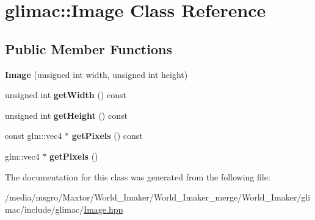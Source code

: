 \hypertarget{classglimac_1_1Image}{}\section{glimac\+:\+:Image Class Reference}
\label{classglimac_1_1Image}
\subsection*{Public Member Functions}
\begin{DoxyCompactItemize}
\item 
\mbox{\label{classglimac_1_1Image_a8d0769d9756924f57b740e48e9fb09f6}} 
{\bfseries Image} (unsigned int width, unsigned int height)
\item 
\mbox{\label{classglimac_1_1Image_a23bc966575ee67b85fc575631b035026}} 
unsigned int {\bfseries get\+Width} () const
\item 
\mbox{\label{classglimac_1_1Image_a0a2afce624e3df2b12d7d76ba0d31c42}} 
unsigned int {\bfseries get\+Height} () const
\item 
\mbox{\label{classglimac_1_1Image_af2cdd4b884831808f5ecba70209c2f95}} 
const glm\+::vec4 $\ast$ {\bfseries get\+Pixels} () const
\item 
\mbox{\label{classglimac_1_1Image_a679f8ae515ad9607faa762e1e2105285}} 
glm\+::vec4 $\ast$ {\bfseries get\+Pixels} ()
\end{DoxyCompactItemize}


The documentation for this class was generated from the following file\+:\begin{DoxyCompactItemize}
\item 
/media/msgro/\+Maxtor/\+World\+\_\+\+Imaker/\+World\+\_\+\+Imaker\+\_\+merge/\+World\+\_\+\+Imaker/glimac/include/glimac/\hyperlink{Image_8hpp}{Image.\+hpp}\end{DoxyCompactItemize}
